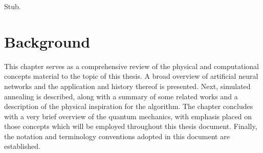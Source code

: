 \documentclass[11pt]{afthesis}
\begin{document}
	
	
	
	Stub.
	
	
	
	
	\chapter{Background} %
	
	This chapter serves as a comprehensive review of the physical and computational concepts material to the topic of this thesis. A broad overview of artificial neural networks and the application and history thereof is presented. Next, simulated annealing is described, along with a summary of some related works and a description of the physical inspiration for the algorithm. The chapter concludes with a very brief overview of the quantum mechanics, with emphasis placed on those concepts which will be employed throughout this thesis document. Finally, the notation and terminology conventions adopted in this document are established.
	
\end{document}
